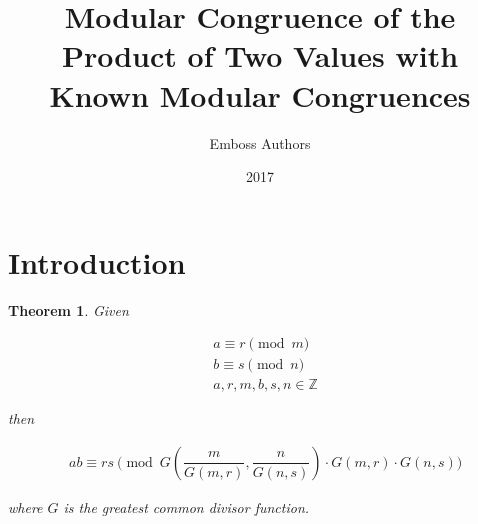 \documentclass{article}
\title{Modular Congruence of the Product of Two Values with Known Modular Congruences}
\author{Emboss Authors}
\date{2017}
\begin{document}
\maketitle

\section{Introduction}

\newtheorem{theorem}{Theorem}


\begin{theorem}
Given

\begin{align*}
  &{a} \equiv {r} \pmod{{m}} \\
  &{b} \equiv {s} \pmod{{n}} \\
  &{a}, {r}, {m}, {b}, {s}, {n} \in \mathbb{Z}
\end{align*}

then

\begin{align*}
  &{a}{b} \equiv {r}{s} \pmod{G\left(\dfrac{{m}}{G\left({m}, {r}\right)},
\dfrac{{n}}{G\left({n}, {s}\right)}\right) \cdot G\left({m}, {r}\right) \cdot
G\left({n}, {s}\right)}
\end{align*}

where $G$ is the greatest common divisor function.
\end{theorem}
\end{document}
